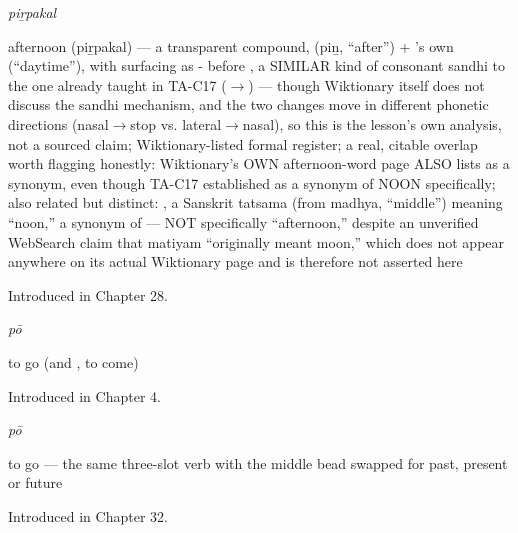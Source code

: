 \noindent\begin{minipage}[t]{\linewidth}
\raggedright
\textbf{}\enspace\emph{piṟpakal}\par
\small afternoon (piṟpakal) — a transparent compound,  (piṉ, \textquotedblleft{}after\textquotedblright{}) + 's own  (\textquotedblleft{}daytime\textquotedblright{}), with  surfacing as - before , a SIMILAR kind of consonant sandhi to the one already taught in TA-C17 ($\to$) — though Wiktionary itself does not discuss the sandhi mechanism, and the two changes move in different phonetic directions (nasal$\to$stop vs. lateral$\to$nasal), so this is the lesson's own analysis, not a sourced claim; Wiktionary-listed formal register; a real, citable overlap worth flagging honestly: Wiktionary's OWN afternoon-word page ALSO lists  as a synonym, even though TA-C17 established  as a synonym of NOON specifically; also related but distinct: , a Sanskrit tatsama (from madhya, \textquotedblleft{}middle\textquotedblright{}) meaning \textquotedblleft{}noon,\textquotedblright{} a synonym of  — NOT specifically \textquotedblleft{}afternoon,\textquotedblright{} despite an unverified WebSearch claim that matiyam \textquotedblleft{}originally meant moon,\textquotedblright{} which does not appear anywhere on its actual Wiktionary page and is therefore not asserted here\par
\footnotesize Introduced in Chapter 28.
\end{minipage}\par\medskip

\noindent\begin{minipage}[t]{\linewidth}
\raggedright
\textbf{}\enspace\emph{pō}\par
\small to go (and , to come)\par
\footnotesize Introduced in Chapter 4.
\end{minipage}\par\medskip

\noindent\begin{minipage}[t]{\linewidth}
\raggedright
\textbf{}\enspace\emph{pō}\par
\small to go — the same three-slot verb with the middle bead swapped for past, present or future\par
\footnotesize Introduced in Chapter 32.
\end{minipage}\par\medskip

